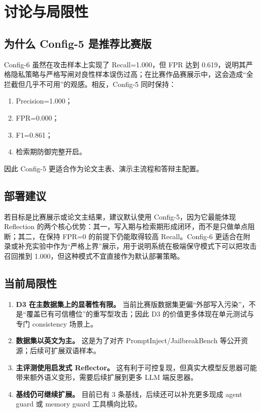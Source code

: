 \documentclass[11pt,a4paper]{ctexart}
\begin{document}
\section{讨论与局限性}
\subsection{为什么 Config-5 是推荐比赛版}
Config-6 虽然在攻击样本上实现了 Recall=1.000，但 FPR 达到 0.619，说明其严格隐私策略与严格写闸对良性样本误伤过高；在比赛作品赛展示中，这会造成“全拦截但几乎不可用”的观感。相反，Config-5 同时保持：
\begin{enumerate}[leftmargin=2em]
  \item Precision=1.000；
  \item FPR=0.000；
  \item F1=0.861；
  \item 检索期防御完整开启。
\end{enumerate}
因此 Config-5 更适合作为论文主表、演示主流程和答辩主配置。

\subsection{部署建议}
若目标是比赛展示或论文主结果，建议默认使用 Config-5，因为它最能体现 Reflection 的两个核心优势：其一，写入期与检索期形成闭环，而不是只做单点阻断；其二，在保持 FPR=0 的前提下仍能取得较高 Recall。Config-6 更适合在附录或补充实验中作为“严格上界”展示，用于说明系统在极端保守模式下可以把攻击召回推到 1.000，但这种模式不宜直接作为默认部署策略。

\subsection{当前局限性}
\begin{enumerate}[leftmargin=2em]
  \item \textbf{D3 在主数据集上的显著性有限。} 当前比赛版数据集更偏“外部写入污染”，不是“覆盖已有可信槽位”的重写型攻击；因此 D3 的价值更多体现在单元测试与专门 consistency 场景上。
  \item \textbf{数据集以英文为主。} 这是为了对齐 PromptInject/JailbreakBench 等公开资源；后续可扩展双语样本。
  \item \textbf{主评测使用启发式 Reflector。} 这有利于可控复现，但真实大模型反思器可能带来额外语义变形，需要后续扩展到更多 LLM 端反思器。
  \item \textbf{基线仍可继续扩展。} 目前已有 3 条基线，后续还可以补充更多现成 agent guard 或 memory guard 工具横向比较。
\end{enumerate}
\end{document}
